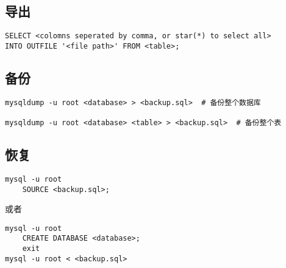 \documentclass[a4paper, twoside]{article}
\begin{document}
\subsection{导出}

\begin{verbatim}
SELECT <colomns seperated by comma, or star(*) to select all>
INTO OUTFILE '<file path>' FROM <table>;
\end{verbatim}

\subsection{备份}

\begin{verbatim}
mysqldump -u root <database> > <backup.sql>  # 备份整个数据库

mysqldump -u root <database> <table> > <backup.sql>  # 备份整个表
\end{verbatim}

\subsection{恢复}

\begin{verbatim}
mysql -u root
    SOURCE <backup.sql>;
\end{verbatim}

或者

\begin{verbatim}
mysql -u root
    CREATE DATABASE <database>;
    exit
mysql -u root < <backup.sql>
\end{verbatim}
\end{document}
